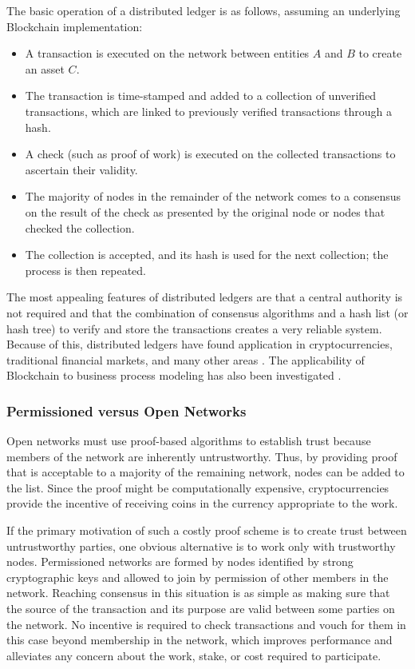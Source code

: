 The basic operation of a distributed ledger is as follows, assuming an underlying Blockchain implementation:
\begin{itemize}
    \item A transaction is executed on the network between entities $A$ and $B$ to create an asset $C$.
    \item The transaction is time-stamped and added to a collection of unverified transactions, which are linked to previously verified transactions through a hash.
    \item A check (such as proof of work) is executed on the collected transactions to ascertain their validity. 
    \item The majority of nodes in the remainder of the network comes to a consensus on the result of the check as presented by the original node or nodes that checked the collection.
    \item The collection is accepted, and its hash is used for the next collection; the process is then repeated.
\end{itemize}

The most appealing features of distributed ledgers are that a central authority is not required and that the combination of consensus algorithms and a hash list (or hash tree) to verify and store the transactions creates a very reliable system. Because of this, distributed ledgers have found application in cryptocurrencies, traditional financial markets, and many other areas \cite{noauthor_groups:requirements:use-case-inventory_nodate} \cite{noauthor_discussion_2018}. The applicability of Blockchain to business process modeling has also been investigated \cite{Mendling:2018:BBP:3146385.3183367}.

\subsubsection{Permissioned versus Open Networks}
Open networks must use proof-based algorithms to establish trust because members of the network are inherently untrustworthy. Thus, by providing proof that is acceptable to a majority of the remaining network, nodes can be added to the list. Since the proof might be computationally expensive, cryptocurrencies provide the incentive of receiving coins in the currency appropriate to the work.

If the primary motivation of such a costly proof scheme is to create trust between untrustworthy parties, one obvious alternative is to work only with trustworthy nodes. Permissioned networks are formed by nodes identified by strong cryptographic keys and allowed to join by permission of other members in the network. Reaching consensus in this situation is as simple as making sure that the source of the transaction and its purpose are valid between some parties on the network. No incentive is required to check transactions and vouch for them in this case beyond membership in the network, which improves performance and alleviates any concern about the work, stake, or cost required to participate.

